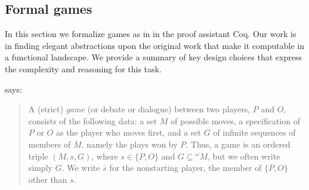 \documentclass{article}
\theoremstyle{definition}
\begin{document}
\subsection{Formal games}
In this section we formalize games as in \textcite{Blass1992} in the proof assistant Coq. Our work is in finding elegant abstractions upon the original work that make it computable in a functional landscape. We provide a summary of key design choices that express the complexity and reasoning for this task. 

\textcite[p.~187]{Blass1992} says:
\begin{quote}
A (strict) \emph{game} (or debate or dialogue) between two players, $P$ and $O$, consists of the following data: a set $M$ of possible moves, a specification of $P$ or $O$ as the player who moves first, and a set $G$ of infinite sequences of members of $M$, namely the plays won by $P$. Thus, a game is an ordered triple $(M, s, G)$, where $s \in \{P, O\}$ and $G \subseteq {}^\omega M$, but we often write simply $G$. We write $\bar s$ for the nonstarting player, the member of $\{P, O\}$ other than $s$.
\end{quote}
\end{document}
